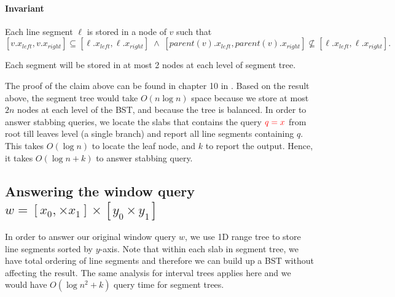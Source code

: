 \paragraph{Invariant} Each line segment $\ell$ is stored in a node of $v$ such that 
\[ [v.x_{left}, v.x_{right}] \subseteq [ \ell.x_{left}, \ell.x_{right}]   \; \wedge \; [parent(v).x_{left}, parent(v).x_{right}] \not \subseteq [\ell.x_{left}, \ell.x_{right}].   \]

\begin{claim}
Each segment will be stored in at most 2 nodes at each level of segment tree.
\end{claim} 

The proof of the claim above can be found in chapter 10 in \cite{Berg:2008}. Based on the result above, the segment tree would take $O(n \log n)$ space because we store at most $2n$ nodes at each level of the BST, and because the tree is balanced. 
%
In order to answer stabbing queries, we locate the slabs that contains the query $\textcolor{red}{q = x}$ from root till leaves level (a single branch) and report all line segments containing $q$.
%
This takes $O(\log n)  $ to locate the leaf node, and $k$ to report the output. Hence, it takes $O(\log n + k)$ to answer stabbing query.

\subsection*{Answering the window query $w = [x_0, \times x_1] \times [y_0 \times y_1 ]$}
In order to answer our original window query $w$, we use 1D range tree to store line segments sorted by $y$-axis. 
%
Note that within each slab in segment tree, we have total ordering of line segments and therefore we can build up a BST without affecting the result.
%
The same analysis for interval trees applies here and we would  have $O(\log n^2 + k)$ query time for segment trees.
